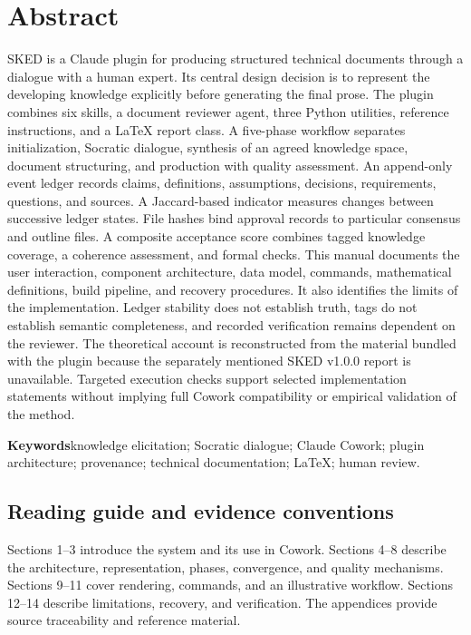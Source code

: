 \documentclass[12pt,a4paper]{article}
\begin{document}
\section*{Abstract}
SKED is a Claude plugin for producing structured technical documents through a dialogue with a human expert. Its central design decision is to represent the developing knowledge explicitly before generating the final prose. The plugin combines six skills, a document reviewer agent, three Python utilities, reference instructions, and a LaTeX report class. A five-phase workflow separates initialization, Socratic dialogue, synthesis of an agreed knowledge space, document structuring, and production with quality assessment. An append-only event ledger records claims, definitions, assumptions, decisions, requirements, questions, and sources. A Jaccard-based indicator measures changes between successive ledger states. File hashes bind approval records to particular consensus and outline files. A composite acceptance score combines tagged knowledge coverage, a coherence assessment, and formal checks. This manual documents the user interaction, component architecture, data model, commands, mathematical definitions, build pipeline, and recovery procedures. It also identifies the limits of the implementation. Ledger stability does not establish truth, tags do not establish semantic completeness, and recorded verification remains dependent on the reviewer. The theoretical account is reconstructed from the material bundled with the plugin because the separately mentioned SKED v1.0.0 report is unavailable. Targeted execution checks support selected implementation statements without implying full Cowork compatibility or empirical validation of the method.

\noindent\textbf{Keywords}\quad knowledge elicitation; Socratic dialogue; Claude Cowork; plugin architecture; provenance; technical documentation; LaTeX; human review.

\subsection*{Reading guide and evidence conventions}
Sections 1--3 introduce the system and its use in Cowork. Sections 4--8 describe the architecture, representation, phases, convergence, and quality mechanisms. Sections 9--11 cover rendering, commands, and an illustrative workflow. Sections 12--14 describe limitations, recovery, and verification. The appendices provide source traceability and reference material.
\end{document}
